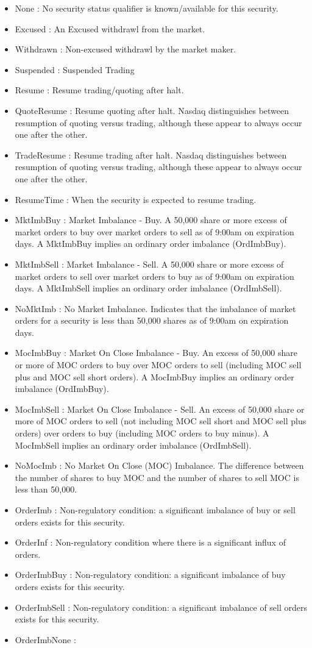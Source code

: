 \begin{itemize}
\item None : No security status qualifier is known/available for this security. \item Excused : An Excused withdrawl from the market. \item Withdrawn : Non-excused withdrawl by the market maker. \item Suspended : Suspended Trading \item Resume : Resume trading/quoting after halt. \item Quote\-Resume : Resume quoting after halt. Nasdaq distinguishes between resumption of quoting versus trading, although these appear to always occur one after the other. \item Trade\-Resume : Resume trading after halt. Nasdaq distinguishes between resumption of quoting versus trading, although these appear to always occur one after the other. \item Resume\-Time : When the security is expected to resume trading. \item Mkt\-Imb\-Buy : Market Imbalance - Buy. A 50,000 share or more excess of market orders to buy over market orders to sell as of 9:00am on expiration days. A Mkt\-Imb\-Buy implies an ordinary order imbalance (Ord\-Imb\-Buy). \item Mkt\-Imb\-Sell : Market Imbalance - Sell. A 50,000 share or more excess of market orders to sell over market orders to buy as of 9:00am on expiration days. A Mkt\-Imb\-Sell implies an ordinary order imbalance (Ord\-Imb\-Sell). \item No\-Mkt\-Imb : No Market Imbalance. Indicates that the imbalance of market orders for a security is less than 50,000 shares as of 9:00am on expiration days. \item Moc\-Imb\-Buy : Market On Close Imbalance - Buy. An excess of 50,000 share or more of MOC orders to buy over MOC orders to sell (including MOC sell plus and MOC sell short orders). A Moc\-Imb\-Buy implies an ordinary order imbalance (Ord\-Imb\-Buy). \item Moc\-Imb\-Sell : Market On Close Imbalance - Sell. An excess of 50,000 share or more of MOC orders to sell (not including MOC sell short and MOC sell plus orders) over orders to buy (including MOC orders to buy minus). A Moc\-Imb\-Sell implies an ordinary order imbalance (Ord\-Imb\-Sell). \item No\-Moc\-Imb : No Market On Close (MOC) Imbalance. The difference between the number of shares to buy MOC and the number of shares to sell MOC is less than 50,000. \item Order\-Imb : Non-regulatory condition: a significant imbalance of buy or sell orders exists for this security. \item Order\-Inf : Non-regulatory condition where there is a significant influx of orders. \item Order\-Imb\-Buy : Non-regulatory condition: a significant imbalance of buy orders exists for this security. \item Order\-Imb\-Sell : Non-regulatory condition: a significant imbalance of sell orders exists for this security. \item Order\-Imb\-None : 
\end{itemize}

